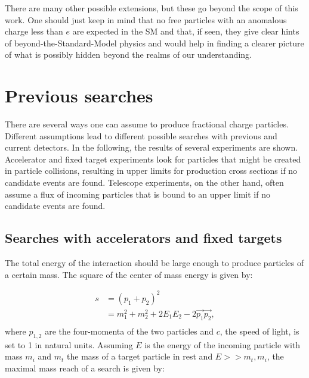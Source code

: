 \noindent There are many other possible extensions, but these go beyond the scope of this work. One should just keep in mind that no free particles with an anomalous charge less than $e$ are expected in the SM and that, if seen, they give clear hints of beyond-the-Standard-Model physics and would help in finding a clearer picture of what is possibly hidden beyond the realms of our understanding.





\section{Previous searches}
\label{sec:prevsearches}
There are several ways one can assume to produce fractional charge particles. Different assumptions lead to different possible searches with previous and current detectors. In the following, the results of several experiments are shown. Accelerator and fixed target experiments look for particles that might be created in particle collisions, resulting in upper limits for production cross sections if no candidate events are found. Telescope experiments, on the other hand, often assume a flux of incoming particles that is bound to an upper limit if no candidate events are found.

\subsection{Searches with accelerators and fixed targets}
The total energy of the interaction should be large enough to produce particles of a certain mass. The square of the center of mass energy is given by:

\begin{equation}
\label{eq:totalenergy}
\begin{split}
s &= \left(p_1 + p_2\right)^2\\
&= m_1^2 + m_2^2 + 2E_1E_2 - 2\vec{p_1}\vec{p_2},\\
\end{split}
\end{equation}
where $p_{1,2}$ are the four-momenta of the two particles and $c$, the speed of light, is set to 1 in natural units.
Assuming $E$ is the energy of the incoming particle with mass $m_i$ and $m_t$ the mass of a target particle in rest and $E >> m_t, m_i$, the maximal mass reach of a search is given by:

